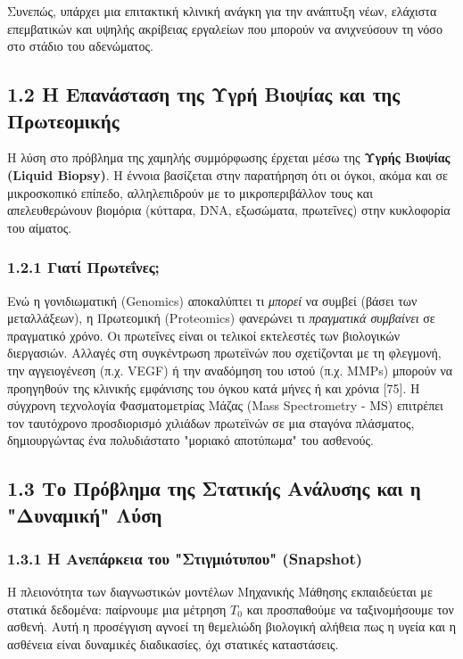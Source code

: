 Συνεπώς, υπάρχει μια επιτακτική κλινική ανάγκη για την ανάπτυξη νέων, ελάχιστα επεμβατικών και υψηλής ακρίβειας εργαλείων που μπορούν να ανιχνεύσουν τη νόσο στο στάδιο του αδενώματος.

\subsection{1.2 Η Επανάσταση της Υγρή Βιοψίας και της Πρωτεομικής}

Η λύση στο πρόβλημα της χαμηλής συμμόρφωσης έρχεται μέσω της \textbf{Υγρής Βιοψίας (Liquid Biopsy)}. Η έννοια βασίζεται στην παρατήρηση ότι οι όγκοι, ακόμα και σε μικροσκοπικό επίπεδο, αλληλεπιδρούν με το μικροπεριβάλλον τους και απελευθερώνουν βιομόρια (κύτταρα, DNA, εξωσώματα, πρωτεΐνες) στην κυκλοφορία του αίματος.

\subsubsection{1.2.1 Γιατί Πρωτεΐνες;}

Ενώ η γονιδιωματική (Genomics) αποκαλύπτει τι \emph{μπορεί} να συμβεί (βάσει των μεταλλάξεων), η Πρωτεομική (Proteomics) φανερώνει τι \emph{πραγματικά συμβαίνει} σε πραγματικό χρόνο. Οι πρωτεΐνες είναι οι τελικοί εκτελεστές των βιολογικών διεργασιών. Αλλαγές στη συγκέντρωση πρωτεϊνών που σχετίζονται με τη φλεγμονή, την αγγειογένεση (π.χ. VEGF) ή την αναδόμηση του ιστού (π.χ. MMPs) μπορούν να προηγηθούν της κλινικής εμφάνισης του όγκου κατά μήνες ή και χρόνια [75]. Η σύγχρονη τεχνολογία Φασματομετρίας Μάζας (Mass Spectrometry - MS) επιτρέπει τον ταυτόχρονο προσδιορισμό χιλιάδων πρωτεϊνών σε μια σταγόνα πλάσματος, δημιουργώντας ένα πολυδιάστατο "μοριακό αποτύπωμα" του ασθενούς.

\subsection{1.3 Το Πρόβλημα της Στατικής Ανάλυσης και η "Δυναμική" Λύση}

\subsubsection{1.3.1 Η Ανεπάρκεια του "Στιγμιότυπου" (Snapshot)}

Η πλειονότητα των διαγνωστικών μοντέλων Μηχανικής Μάθησης εκπαιδεύεται με στατικά δεδομένα: παίρνουμε μια μέτρηση $T_0$ και προσπαθούμε να ταξινομήσουμε τον ασθενή. Αυτή η προσέγγιση αγνοεί τη θεμελιώδη βιολογική αλήθεια πως η υγεία και η ασθένεια είναι δυναμικές διαδικασίες, όχι στατικές καταστάσεις.

